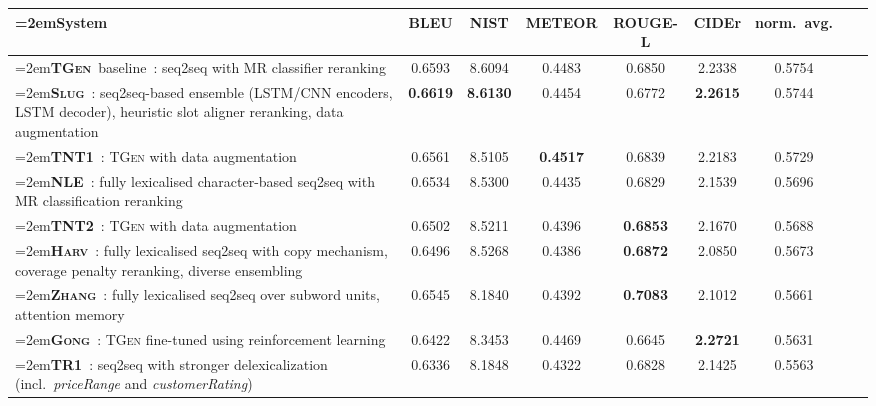 \documentclass[11pt,a4paper]{article}
\newcommand\tgen{\textsc{TGen}\xspace}
\newcommand\slug{\textsc{Slug}\xspace}
\newcommand\tntnlgi{\textsc{TNT1}\xspace}
\newcommand\tntnlgii{\textsc{TNT2}\xspace}
\newcommand\gong{\textsc{Gong}\xspace}
\newcommand\harv{\textsc{Harv}\xspace}
\newcommand\nle{\textsc{NLE}\xspace}
\newcommand\thomsoni{\textsc{TR1}\xspace}
\newcommand\zhang{\textsc{Zhang}\xspace}
\newcommand{\symbseq}{}
\newcommand\Ctgen{\textcolor{seqtoseq}{\symbseq\bf \tgen}}
\newcommand\Cslug{\textcolor{seqtoseq}{\symbseq\bf \slug}}
\newcommand\Ctntnlgi{\textcolor{seqtoseq}{\symbseq\bf \tntnlgi}}
\newcommand\Ctntnlgii{\textcolor{seqtoseq}{\symbseq\bf \tntnlgii}}
\newcommand\Cgong{\textcolor{seqtoseq}{\symbseq\bf \gong}}
\newcommand\Charv{\textcolor{seqtoseq}{\symbseq\bf \harv}}
\newcommand\Cnle{\textcolor{seqtoseq}{\symbseq\bf \nle}}
\newcommand\Cthomsoni{\textcolor{seqtoseq}{\symbseq\bf \thomsoni}}
\newcommand\Czhang{\textcolor{seqtoseq}{\symbseq\bf \zhang}}
\begin{document}
\begin{table*}[t]
\begin{center}
\scriptsize
\setlength{\extrarowheight}{3pt}
\begin{tabular}{>{\hspace{-1mm}\raggedright\hangindent=2em\arraybackslash}m{8.8cm}>{\hspace{-1mm}}cccccccc}
\textbf{System} & \bf BLEU & \bf NIST & \bf \hspace{-2mm}METEOR\hspace{-1mm} & \bf \hspace{-2mm}ROUGE-L\hspace{-3mm} & \bf CIDEr & \bf \hspace{-2mm}norm.~avg.\hspace{-2mm} \\ \hline\hline
\Ctgen\ baseline~\cite{novikova_e2e_2017}: seq2seq with MR classifier reranking & 0.6593  & 8.6094  & 0.4483  & 0.6850  & 2.2338 & 0.5754 \\\hdashline[0.5pt/2pt]
\Cslug~\cite{juraska_slug2slug:_2018}: seq2seq-based ensemble (LSTM/CNN encoders, LSTM decoder), heuristic slot aligner reranking, data augmentation & \bf 0.6619  & \bf 8.6130  & 0.4454  & 0.6772  & \bf 2.2615 & 0.5744 \\
\Ctntnlgi~\cite{oraby_tntnlg-personage_2018}: \tgen with data augmentation  & 0.6561  & 8.5105  & \bf 0.4517  & 0.6839  & 2.2183 & 0.5729 \\
\Cnle~\cite{agarwal_char-based_2018}: fully lexicalised character-based seq2seq with MR classification reranking & 0.6534  & 8.5300  & 0.4435  & 0.6829  & 2.1539 & 0.5696 \\
\Ctntnlgii~\cite{tandon_tntnlg-mr_shuffle_2018}: \tgen with data augmentation & 0.6502  & 8.5211  & 0.4396  & \bf 0.6853  & 2.1670 & 0.5688 \\
\Charv~\cite{gehrmann_end--end_2018}: fully lexicalised seq2seq with copy mechanism, coverage penalty reranking, diverse ensembling  & 0.6496  & 8.5268  & 0.4386  & \bf 0.6872  & 2.0850 & 0.5673 \\
\Czhang~\cite{zhang_attention_2018}: fully lexicalised seq2seq over subword units, attention memory & 0.6545  & 8.1840  & 0.4392  &\bf 0.7083  & 2.1012 & 0.5661 \\
\Cgong~\cite{gong_technical_2018}: \tgen fine-tuned using reinforcement learning  & 0.6422  & 8.3453  & 0.4469  & 0.6645  & \bf 2.2721 & 0.5631 \\
\Cthomsoni~\cite{schilder_e2e_2018}: seq2seq with stronger delexicalization (incl.\ \emph{priceRange} and \emph{customerRating})  & 0.6336  & 8.1848  & 0.4322  & 0.6828  & 2.1425 & 0.5563 \\

\end{tabular}
\end{center}
\end{table*}
\end{document}
